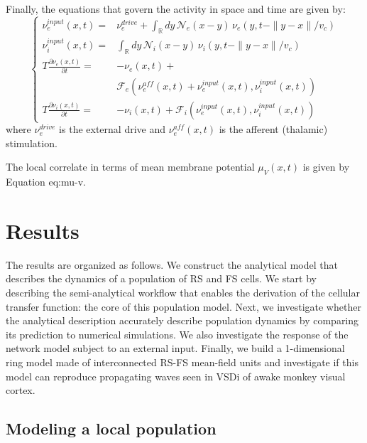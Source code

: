 \documentclass[8pt, colorlinks, a4paper]{article}
\renewcommand\ref{}
\newcommand{\corr}[1]{{#1}}
\begin{document}
\corr{Finally, the equations that govern the activity in space and
  time are given by:}
\begin{equation}
\left\{
\begin{split}
\nu_e^{input}(x,t) = &\nu_e^{drive}  + 
\int_\mathbb{R} dy \, \mathcal{N}_e(x-y) \, \nu_e(y, t-\|y-x\|/v_c) \\
\nu_i^{input}(x,t) = & \int_\mathbb{R} dy \, \mathcal{N}_i(x-y) \, \nu_i(y, t-\|y-x\|/v_c) \\
T \frac{\partial \nu_e(x,t)}{\partial t} = & -  \nu_e(x,t) + \\
& \mathcal{F}_e(\nu_e^{aff}(x,t)+\nu_e^{input}(x,t), \nu_i^{input}(x,t) ) \\
T \frac{\partial \nu_i(x,t)}{\partial t} = & -  \nu_i(x,t) + \mathcal{F}_i(\nu_e^{input}(x,t), \nu_i^{input}(x,t) )
\end{split}
\right.
\end{equation}
\corr{where \(\nu_e^{drive}\) is the external drive and \(\nu_e^{aff}(x,t)\)
is the afferent (thalamic) stimulation.}

\corr{The local correlate in terms of mean membrane potential
  \(\mu_V(x,t)\) is given by Equation \ref{eq:mu-v}.}

\section{Results}
\label{sec-4}
\normalsize

The results are organized as follows. We construct the analytical
model that describes the dynamics of \corr{a population of RS and FS
  cells}. We start by describing the semi-analytical workflow that
enables the derivation of the cellular transfer function: the core of
this population model. Next, we investigate whether the analytical
description accurately describe population dynamics by comparing its
prediction to numerical simulations. We also investigate the response
of the network model subject to an external input. \corr{Finally, we
  build a 1-dimensional ring model made of interconnected RS-FS
  mean-field units and investigate if this model can reproduce
  propagating waves seen in VSDi of awake monkey visual cortex.}

\subsection{Modeling a local population}
\label{sec-4-1}
\end{document}
